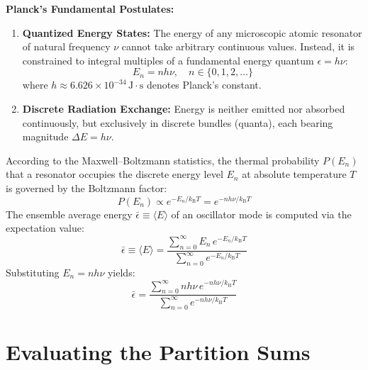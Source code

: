 \documentclass[11pt,a4paper]{article}
\newcommand{\kB}{k_{\mathrm{B}}}
\newcommand{\avgE}{\langle E \rangle}
\begin{document}
\begin{postulatebox}
\textbf{Planck's Fundamental Postulates:}
\begin{enumerate}[label=(\roman*)]
    \item \textbf{Quantized Energy States:} The energy of any microscopic atomic resonator of natural frequency $\nu$ cannot take arbitrary continuous values. Instead, it is constrained to integral multiples of a fundamental energy quantum $\epsilon = h\nu$:
    \begin{equation}
        E_n = n h \nu, \quad n \in \{0, 1, 2, \dots\} \tag{I}
    \end{equation}
    where $h \approx 6.626 \times 10^{-34}\,\mathrm{J}\cdot\mathrm{s}$ denotes Planck's constant.
    \item \textbf{Discrete Radiation Exchange:} Energy is neither emitted nor absorbed continuously, but exclusively in discrete bundles (quanta), each bearing magnitude $\Delta E = h\nu$.
\end{enumerate}
\end{postulatebox}

According to the Maxwell--Boltzmann statistics, the thermal probability $P(E_n)$ that a resonator occupies the discrete energy level $E_n$ at absolute temperature $T$ is governed by the Boltzmann factor:
\begin{equation}
    P(E_n) \propto e^{-E_n / \kB T} = e^{-n h \nu / \kB T}
\end{equation}
The ensemble average energy $\bar{\epsilon} \equiv \avgE$ of an oscillator mode is computed via the expectation value:
\begin{equation}
    \bar{\epsilon} \equiv \avgE = \frac{\sum_{n=0}^{\infty} E_n \, e^{-E_n / \kB T}}{\sum_{n=0}^{\infty} e^{-E_n / \kB T}} \tag{II}
\end{equation}
Substituting $E_n = n h \nu$ yields:
\begin{equation}
    \bar{\epsilon} = \frac{\sum_{n=0}^{\infty} n h \nu \, e^{-n h \nu / \kB T}}{\sum_{n=0}^{\infty} e^{-n h \nu / \kB T}} \tag{III}
\end{equation}

\section{Evaluating the Partition Sums}
\end{document}
